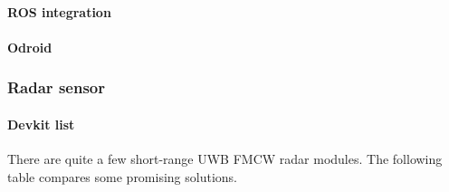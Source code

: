 \paragraph{ROS integration}\label{ros-integration}

\paragraph{Odroid}\label{odroid}

\subsubsection{Radar sensor}\label{radar-sensor}

\paragraph{Devkit list}\label{devkit-list}

There are quite a few short-range UWB FMCW radar modules. The following
table compares some promising solutions.

